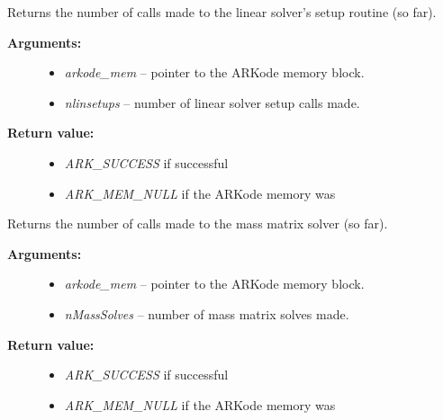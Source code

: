 \documentclass[letterpaper,10pt,english]{sphinxmanual}
\begin{document}
\begin{fulllineitems}
\label{c_interface/User_callable:c.ARKodeGetNumLinSolvSetups}
Returns the number of calls made to the linear solver's
setup routine (so far).
\begin{description}
\item[{\textbf{Arguments:}}] \leavevmode\begin{itemize}
\item {} 
\emph{arkode\_mem} -- pointer to the ARKode memory block.

\item {} 
\emph{nlinsetups} -- number of linear solver setup calls made.

\end{itemize}

\item[{\textbf{Return value:}}] \leavevmode\begin{itemize}
\item {} 
\emph{ARK\_SUCCESS} if successful

\item {} 
\emph{ARK\_MEM\_NULL} if the ARKode memory was 

\end{itemize}

\end{description}

\end{fulllineitems}


\begin{fulllineitems}
\label{c_interface/User_callable:c.ARKodeGetNumMassSolves}
Returns the number of calls made to the mass matrix solver (so far).
\begin{description}
\item[{\textbf{Arguments:}}] \leavevmode\begin{itemize}
\item {} 
\emph{arkode\_mem} -- pointer to the ARKode memory block.

\item {} 
\emph{nMassSolves} -- number of mass matrix solves made.

\end{itemize}

\item[{\textbf{Return value:}}] \leavevmode\begin{itemize}
\item {} 
\emph{ARK\_SUCCESS} if successful

\item {} 
\emph{ARK\_MEM\_NULL} if the ARKode memory was 

\end{itemize}

\end{description}

\end{fulllineitems}
\end{document}
